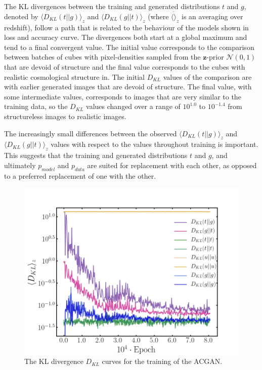 \documentclass[twocolumn]{article}
\numberwithin{equation}{section}
\begin{document}
The KL divergences between the training and generated distributions $t$ and $g$, denoted by $\langle D_{KL}(t||g) \rangle_z$ 
and $\langle D_{KL}(g||t) \rangle_z$ (where $\langle\dot\rangle_z$ is an averaging over redshift), follow a path that is 
related to the behaviour of the models shown in loss and accuracy curve. The divergences both start at a global maximum and 
tend to a final convergent value. The initial value corresponds to the comparison between batches of cubes with 
pixel-densities sampled from the $\mathbf{z}$-prior $\mathcal{N}(0,1)$ that are devoid of structure and the final value 
corresponds to the cubes with realistic cosmological structure in. 
The initial $D_{KL}$ values of the comparison are with earlier generated images that are 
devoid of structure. The final value, with some intermediate values, corresponds to images that are very similar to the 
training data, so the $D_{KL}$ values changed over a range of $10^{1.0}$ to $10^{-1.4}$ from structureless images to 
realistic images.


The increasingly small differences between the observed $\langle D_{KL}(t||g) \rangle_z$ and $\langle D_{KL}(g||t) \rangle_z$ 
values with respect to the values throughout training is important. This suggests that the training and generated distributions 
$t$ and $g$, and ultimately $p_{model}$ and $p_{data}$ are suited for replacement with each other, as opposed to a preferred 
replacement of one with the other.

\begin{figure}[!ht]%
\includegraphics[width=\columnwidth]{figures/graphs/stats1.png}
\centering
\caption{The KL divergence $D_{KL}$ curves for the training of the ACGAN.}
\label{fig:2dgan_losscurve}
\end{figure}
\end{document}
